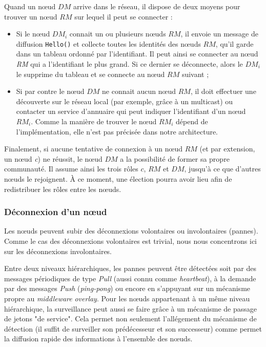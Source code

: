 Quand un n{\oe}ud $DM$ arrive dans le réseau, il dispose de deux moyens pour trouver un n{\oe}ud $RM$ sur lequel il peut se connecter :
\begin{itemize}
	\item Si le n{\oe}ud $DM_i$ connait un ou plusieurs n{\oe}uds $RM$, il envoie un message de diffusion \texttt{Hello()} et collecte toutes les identités des n{\oe}uds $RM$, qu'il garde dans un tableau ordonné par l'identifiant. Il peut ainsi se connecter au n{\oe}ud \textit{RM} qui a l'identifiant le plus grand. Si ce dernier se déconnecte, alors le $DM_i$ le supprime du tableau et se connecte au n{\oe}ud $RM$ suivant ; 
	\item Si par contre le n{\oe}ud $DM$ ne connait aucun n{\oe}ud $RM$, il doit effectuer une découverte sur le réseau local (par exemple, grâce à un multicast) ou contacter un service d'annuaire qui peut indiquer l'identifiant d'un n{\oe}ud $RM_i$. Comme la manière de trouver le n{\oe}ud $RM_i$ dépend de l'implémentation, elle n'est pas précisée dans notre architecture.
\end{itemize}
Finalement, si aucune tentative de connexion à un n{\oe}ud $RM$ (et par extension, un n{\oe}ud \textit{c}) ne réussit, le n{\oe}ud $DM$ a la possibilité de former sa propre communauté. Il assume ainsi les trois rôles $c$, $RM$ et $DM$, jusqu'à ce que d'autres n{\oe}uds le rejoignent. À ce moment, une élection pourra avoir lieu afin de redistribuer les rôles entre les n{\oe}uds.

\subsubsection*{Déconnexion d'un n{\oe}ud} 

Les n{\oe}uds peuvent subir des déconnexions volontaires ou involontaires (pannes). Comme le cas des déconnexions volontaires est trivial, nous nous concentrons ici sur les déconnexions involontaires.

Entre deux niveaux hiérarchiques, les pannes peuvent être détectées soit par des messages périodiques de type \textit{Pull} (aussi connu comme \textit{heartbeat}), à la demande par des messages \textit{Push} (\textit{ping-pong}) \cite{Chandra96} ou encore en s'appuyant sur un mécanisme propre au \textit{middleware} \textit{overlay}. Pour les n{\oe}uds appartenant à un même niveau hiérarchique, la surveillance peut aussi se faire grâce à un mécanisme de passage de jetons "de service". Cela permet non seulement l'allégement du mécanisme de détection (il suffit de surveiller son prédécesseur et son successeur) comme permet la diffusion rapide des informations à l'ensemble des n{\oe}uds.

